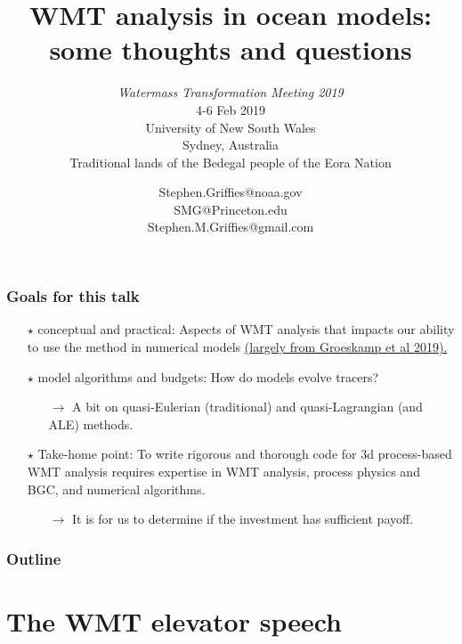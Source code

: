 \documentclass[10pt]{beamer}
\title[WMT and numerical models]{WMT analysis in ocean models: \\ some
  thoughts and questions} %
\subtitle{ {\it Watermass Transformation Meeting 2019} \\
  4-6  Feb 2019 \\ \vspace{.25cm}
  University of New South Wales \\
 Sydney, Australia  \\ Traditional lands of the Bedegal people of the Eora Nation
}
\author[{\sc Stephen.M.Griffies@gmail.com}] %
{ {\sc Stephen.Griffies@noaa.gov  \\ SMG@Princeton.edu \\  Stephen.M.Griffies@gmail.com 
} 
}
\institute[NOAA/GFDL + Princeton University]{NOAA/GFDL + Princeton University}
\date{}
\begin{document}
\footnotesize 

  
\begin{frame}
  \titlepage
\end{frame}




\begin{frame}
  \frametitle{Goals for this talk}

\begin{itemize}

\item[$\star$] {\sc conceptual and practical}: Aspects of WMT analysis that
  impacts our ability to use the method in numerical models
  \href{https://www.annualreviews.org/doi/abs/10.1146/annurev-marine-010318-095421}{(largely
    from Groeskamp et al 2019).}

\item [$\star$]  {\sc model algorithms and budgets}: How do models evolve
  tracers?  
\begin{itemize} \footnotesize 
\item[] $\longrightarrow$ A bit on quasi-Eulerian (traditional) and
  quasi-Lagrangian (and ALE) methods.
    \end{itemize}

\item[$\star$] {\sc Take-home point}: To write rigorous and thorough
  code for 3d process-based WMT analysis requires expertise in WMT
  analysis, process physics and BGC, and numerical algorithms.
    \begin{itemize} \footnotesize 
       \item[] $\longrightarrow$ It is for us to determine if the investment has sufficient payoff. 
    \end{itemize}


\end{itemize}


\end{frame}




\begin{frame}
  \frametitle{Outline}
  \tableofcontents
\end{frame}




\section{The WMT elevator speech}
\end{document}
